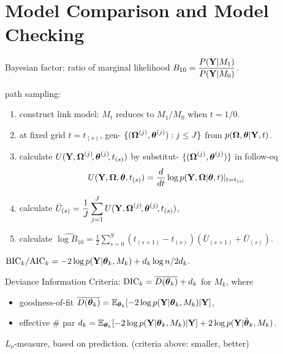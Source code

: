 \vspace{-1em}

\section*{Model Comparison and Model Checking}
\vspace{-1em}

Bayesian factor: ratio of marginal likelihood $B_{10} = \dfrac{P(\mathbf{Y} \vert M_1)}{P(\mathbf{Y} \vert M_0)} $.

\vspace{-1ex} path sampling: \begin{enumerate}
    \item construct link model: $M_t$ reduces to $M_1 / M_0$ when $t = 1 / 0$.
    \item at fixed grid $t = t_{(s)}$, gen- $\{(\boldsymbol{\Omega}^{(j)}, \boldsymbol{\theta}^{(j)}): j \leq J\}$ from $p(\boldsymbol{\Omega}, \boldsymbol{\theta} \vert \mathbf{Y}, t)$.
    \item calculate $U(\mathbf{Y}, \boldsymbol{\Omega}^{(j)}\!, \boldsymbol{\theta}^{(j)}\!, t_{(s)})$ by substitut- $\{(\boldsymbol{\Omega}^{(j)}, \boldsymbol{\theta}^{(j)})\}$ in follow-eq
        \[U(\mathbf{Y}, \boldsymbol{\Omega}, \boldsymbol{\theta}, t_{(s)}) = \frac{d}{dt}\log p(\mathbf{Y}, \boldsymbol{\Omega} \vert \boldsymbol{\theta}, t) \rvert_{t = t_{(s)}}\]
    \item \vspace{-1ex} calculate $\displaystyle \bar{U}_{(s)} = \frac{1}{J} \sum_{j=1}^J U(\mathbf{Y}, \boldsymbol{\Omega}^{(j)}\!, \boldsymbol{\theta}^{(j)}\!, t_{(s)})$,
    \item \vspace{-1ex} calculate $\displaystyle \widehat{\log B_{10}} = \frac{1}{2} \sum_{s = 0}^S (t_{(s + 1)} - t_{(s)})(\bar{U}_{(s+1)} + \bar{U}_{(s)})$.
\end{enumerate}

$\displaystyle \text{BIC}_k/\text{AIC}_k = -2\log p(\mathbf{Y} \vert \boldsymbol{\theta}_k, M_k) + d_k \log n/2 d_k$. 

Deviance Information Criteria: $\text{DIC}_k = \overline{D(\boldsymbol{\theta}_k)} + d_k$ for $M_k$, where \begin{itemize}
    \item goodness-of-fit $\displaystyle \overline{D(\boldsymbol{\theta}_k)} = \mathbb{E}_{\boldsymbol{\theta}_k}\! \left[-2\log p(\mathbf{Y} \vert \boldsymbol{\theta}_k, M_k) \vert \mathbf{Y}\right]$,
    \item effective \# par $\displaystyle d_k = \mathbb{E}_{\boldsymbol{\theta}_k}\! \left[-2\log p(\mathbf{Y} \vert \boldsymbol{\theta}_k, M_k) \vert \mathbf{Y}\right] + 2 \log p(\mathbf{Y} \vert \tilde{\boldsymbol{\theta}}_k, M_k)$.
\end{itemize}

$L_\nu$-measure, based on prediction. (criteria above: smaller, better)

